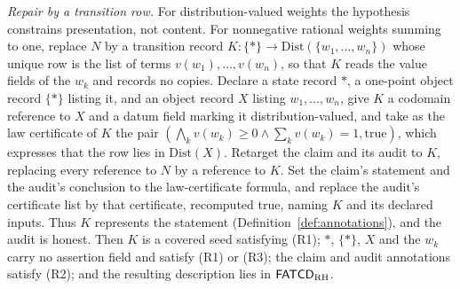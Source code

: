 \begin{remark}
\emph{Repair by a transition row.} For distribution-valued weights the hypothesis constrains presentation, not content. For nonnegative
rational weights summing to one, replace \(N\) by a transition record
\(K:\{*\}\to\mathrm{Dist}(\{w_1,\ldots,w_n\})\) whose unique row is the list
of terms \(v(w_1),\dots,v(w_n)\), so that \(K\) reads the value fields of the
\(w_k\) and records no copies. Declare a state record \(*\), a one-point object record \(\{*\}\) listing it, and an
object record \(X\) listing \(w_1,\dots,w_n\), give \(K\) a codomain reference to
\(X\) and a datum field marking it distribution-valued, and take as the law certificate
of \(K\) the pair \((\bigwedge_k v(w_k)\ge0\wedge\sum_k v(w_k)=1,\mathrm{true})\),
which expresses that the row lies in \(\mathrm{Dist}(X)\). Retarget the claim and its audit to \(K\), replacing every reference
to \(N\) by a reference to \(K\). Set the claim's statement and the
audit's conclusion to the law-certificate formula, and replace the
audit's certificate list by that certificate, recomputed true,
naming \(K\) and its declared inputs. Thus \(K\) represents the
statement (Definition~\ref{def:annotations}), and the audit is honest. Then \(K\) is a covered \Pfour{} seed
satisfying (R1); \(*\), \(\{*\}\), \(X\) and the \(w_k\) carry no assertion field and
satisfy (R1) or (R3); the claim and audit annotations satisfy (R2); and the
resulting description lies in \(\mathsf{FATCD}_{\mathrm{RH}}\).


\end{remark}
